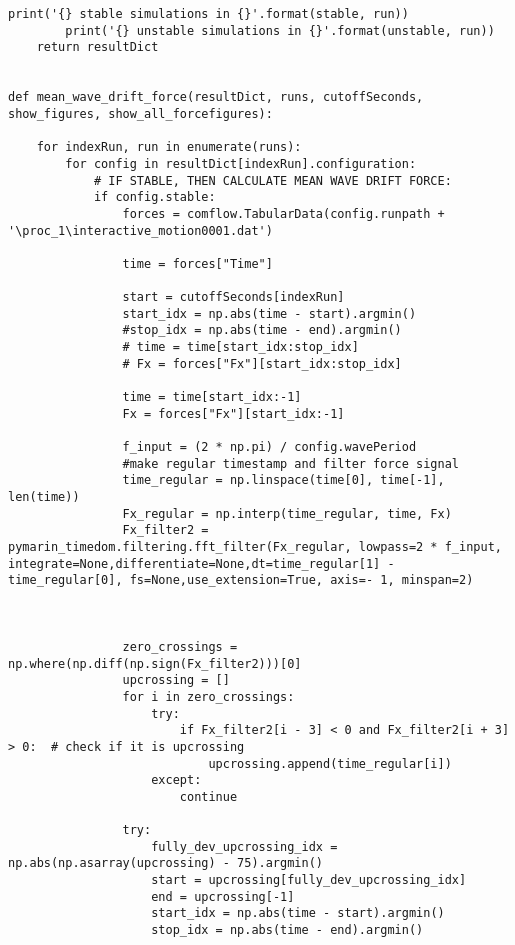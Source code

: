 \begin{mdframed}[backgroundcolor=light-gray, roundcorner=10pt,leftmargin=1, rightmargin=1, innerleftmargin=0, innertopmargin=7,innerbottommargin=0, outerlinewidth=1, linecolor=light-gray]
\begin{lstlisting}[linewidth=\columnwidth,caption=Functions used in post-processing ., label=script: post processing functions]
        print('{} stable simulations in {}'.format(stable, run))
        print('{} unstable simulations in {}'.format(unstable, run))
    return resultDict


def mean_wave_drift_force(resultDict, runs, cutoffSeconds, show_figures, show_all_forcefigures):

    for indexRun, run in enumerate(runs):
        for config in resultDict[indexRun].configuration:
            # IF STABLE, THEN CALCULATE MEAN WAVE DRIFT FORCE:
            if config.stable:
                forces = comflow.TabularData(config.runpath + '\proc_1\interactive_motion0001.dat')

                time = forces["Time"]

                start = cutoffSeconds[indexRun]
                start_idx = np.abs(time - start).argmin()
                #stop_idx = np.abs(time - end).argmin()
                # time = time[start_idx:stop_idx]
                # Fx = forces["Fx"][start_idx:stop_idx]

                time = time[start_idx:-1]
                Fx = forces["Fx"][start_idx:-1]

                f_input = (2 * np.pi) / config.wavePeriod
                #make regular timestamp and filter force signal
                time_regular = np.linspace(time[0], time[-1], len(time))
                Fx_regular = np.interp(time_regular, time, Fx)
                Fx_filter2 = pymarin_timedom.filtering.fft_filter(Fx_regular, lowpass=2 * f_input, integrate=None,differentiate=None,dt=time_regular[1] - time_regular[0], fs=None,use_extension=True, axis=- 1, minspan=2)



                zero_crossings = np.where(np.diff(np.sign(Fx_filter2)))[0]
                upcrossing = []
                for i in zero_crossings:
                    try:
                        if Fx_filter2[i - 3] < 0 and Fx_filter2[i + 3] > 0:  # check if it is upcrossing
                            upcrossing.append(time_regular[i])
                    except:
                        continue

                try:
                    fully_dev_upcrossing_idx = np.abs(np.asarray(upcrossing) - 75).argmin()
                    start = upcrossing[fully_dev_upcrossing_idx]
                    end = upcrossing[-1]
                    start_idx = np.abs(time - start).argmin()
                    stop_idx = np.abs(time - end).argmin()


\end{lstlisting}
\end{mdframed}
